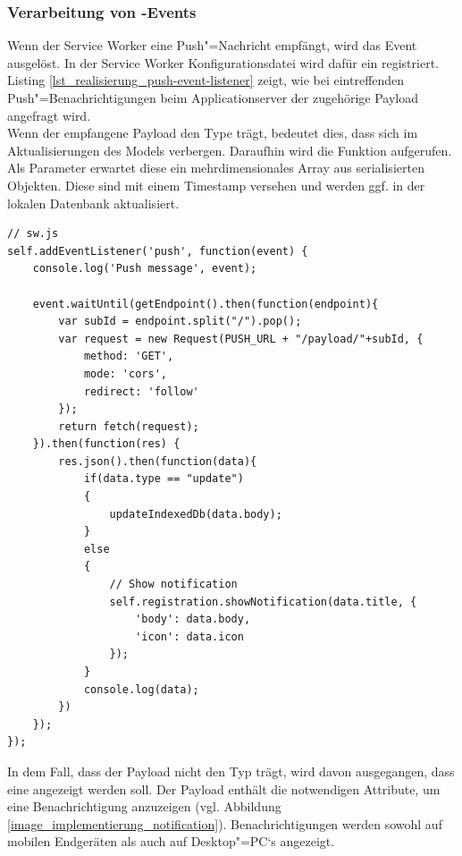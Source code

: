 \subsubsection{Verarbeitung von -Events}

Wenn der Service Worker eine Push"=Nachricht empfängt, wird das Event  ausgelöst. In der Service Worker Konfigurationsdatei wird dafür ein  registriert. Listing \ref{lst_realisierung_push-event-listener} zeigt, wie bei eintreffenden Push"=Benachrichtigungen beim Applicationserver der zugehörige Payload angefragt wird. \\
Wenn der empfangene Payload den Type  trägt, bedeutet dies, dass sich im  Aktualisierungen des Models verbergen. Daraufhin wird die Funktion  aufgerufen. Als Parameter erwartet diese ein mehrdimensionales Array aus serialisierten Objekten. Diese sind mit einem Timestamp versehen und werden ggf. in der lokalen Datenbank aktualisiert. \\

\begin{lstlisting}[caption={Service Worker \code{push}"=EventListener},label={lst_realisierung_push-event-listener}, frame=single]
// sw.js
self.addEventListener('push', function(event) {
    console.log('Push message', event);

    event.waitUntil(getEndpoint().then(function(endpoint){
        var subId = endpoint.split("/").pop();
        var request = new Request(PUSH_URL + "/payload/"+subId, {
            method: 'GET',
            mode: 'cors',
            redirect: 'follow'
        });
        return fetch(request);
    }).then(function(res) {
        res.json().then(function(data){
            if(data.type == "update")
            {
                updateIndexedDb(data.body);
            }
            else
            {
                // Show notification
                self.registration.showNotification(data.title, {
                    'body': data.body,
                    'icon': data.icon
                });
            }
            console.log(data);
        })
    });
});
\end{lstlisting}

In dem Fall, dass der Payload nicht den Typ  trägt, wird davon ausgegangen, dass eine  angezeigt werden soll. Der Payload enthält die notwendigen Attribute, um eine Benachrichtigung anzuzeigen (vgl. Abbildung \ref{image_implementierung_notification}). Benachrichtigungen werden sowohl auf mobilen Endgeräten als auch auf Desktop"=PC`s angezeigt. \\

